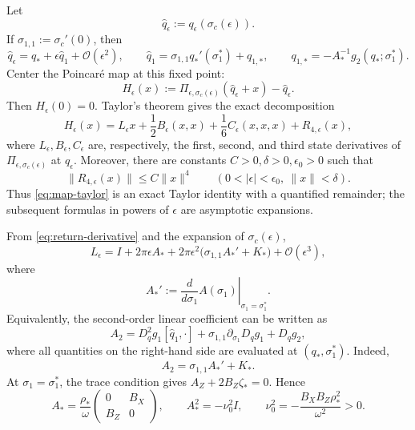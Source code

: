 \documentclass[11pt]{amsart}
\theoremstyle{remark}
\newcommand{\cO}{\mathcal{O}}
\begin{document}
Let
\[
 \widehat q_\epsilon:=q_\epsilon(\sigma_c(\epsilon)).
\]
If \(\sigma_{1,1}:=\sigma_c'(0)\), then
\begin{equation}\label{eq:qhat-expansion}
 \widehat q_\epsilon=q_*+\epsilon\widehat q_1+\cO(\epsilon^2),
 \qquad
 \widehat q_1
=\sigma_{1,1}q_*'(\sigma_1^*)+q_{1,*},
 \qquad
 q_{1,*}=-A_*^{-1}g_2(q_*;\sigma_1^*).
\end{equation}
Center the Poincar\'e map at this fixed point:
\[
 H_\epsilon(x):=
 \Pi_{\epsilon,\sigma_c(\epsilon)}(\widehat q_\epsilon+x)
-\widehat q_\epsilon.
\]
Then \(H_\epsilon(0)=0\).  Taylor's theorem gives the exact decomposition
\begin{equation}\label{eq:map-taylor}
H_\epsilon(x)
=L_\epsilon x+\frac12B_\epsilon(x,x)
+\frac16C_\epsilon(x,x,x)+R_{4,\epsilon}(x),
\end{equation}
where \(L_\epsilon,B_\epsilon,C_\epsilon\) are, respectively, the first,
second, and third state derivatives of
\(\Pi_{\epsilon,\sigma_c(\epsilon)}\) at \(\widehat q_\epsilon\).  Moreover,
there are constants \(C>0,\delta>0,\epsilon_0>0\) such that
\[
 \|R_{4,\epsilon}(x)\|\le C\|x\|^4
 \qquad
 (0<|\epsilon|<\epsilon_0,\ \|x\|<\delta).
\]
Thus \eqref{eq:map-taylor} is an exact Taylor identity with a quantified
remainder; the subsequent formulas in powers of \(\epsilon\) are
asymptotic expansions.

From \eqref{eq:return-derivative} and the expansion of
\(\sigma_c(\epsilon)\),
\begin{equation}\label{eq:L-epsilon}
L_\epsilon
=I+2\pi\epsilon A_*
+2\pi\epsilon^2\bigl(\sigma_{1,1}A_*'+K_*\bigr)
+\cO(\epsilon^3),
\end{equation}
where
\[
 A_*':=\left.\frac{d}{d\sigma_1}A(\sigma_1)\right|_{\sigma_1=\sigma_1^*}.
\]
Equivalently, the second-order linear coefficient can be written as
\begin{equation}\label{eq:A2}
A_2
=D_q^2g_1[\widehat q_1,\cdot]
+\sigma_{1,1}\partial_{\sigma_1}D_qg_1+D_qg_2,
\end{equation}
where all quantities on the right-hand side are evaluated at
\((q_*,\sigma_1^*)\).  Indeed,
\[
 A_2=\sigma_{1,1}A_*'+K_*.
\]
At \(\sigma_1=\sigma_1^*\), the trace condition gives
\(A_Z+2B_Z\zeta_*=0\).  Hence
\begin{equation}\label{eq:Astar}
A_*=\frac{\rho_*}{\omega}
\begin{pmatrix}
0&B_X\\ B_Z&0
\end{pmatrix},
\qquad
A_*^2=-\nu_0^2I,
\qquad
\nu_0^2=-\frac{B_XB_Z\rho_*^2}{\omega^2}>0.
\end{equation}
\end{document}
